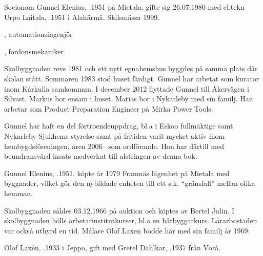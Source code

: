 Socionom Gunnel Elenius, .1951 på Mietala, gifte sig 26.07.1980 med el.tekn Urpo Laitala, .1951 i Alahärmä. Skilsmässa 1999.
\begin{jhchildren}
  \item {}, automationsingenjör
  \item {}, fordonsmekaniker
\end{jhchildren}

Skolbyggnaden revs 1981 och ett nytt egnahemshus byggdes på samma plats där skolan stått. Sommaren 1983 stod huset färdigt. Gunnel har arbetat som kurator inom Kårkulla samkommun. I december 2012 flyttade Gunnel till Åkervägen i Silvast. Markus bor ensam i huset. Matias bor i Nykarleby med sin familj. Han arbetar som Product Preparation Engineer på Mirka Power Tools.

Gunnel har haft en del förtroendeuppdrag, bl.a i  Eskoo fullmäktige samt Nykarleby Sjukhems styrelse samt på fritiden varit mycket aktiv inom hembygdsföreningen, åren 2006-- som ordförande. Hon har därtill med beundransvärd insats medverkat till alstringen av denna bok.





Gunnel Elenius, .1951, köpte år 1979 Framnäs lägenhet på Mietala med byggnader, vilket gör den nybildade enheten till ett s.k. ``gränsfall'' mellan olika hemman.\jhvspace{}


Skolbyggnaden såldes 03.12.1966 på auktion och köptes av Bertel Julin. I skolbyggnaden hölls arbetarinstitutkurser, bl.a en båtbyggarkurs. Lärarbostaden var också uthyrd en tid. Målare Olof Laxen bodde här med sin familj år 1969:

Olof Laxén, .1933 i Jeppo, gift med Gretel Dahlkar, .1937 från Vörå.
\begin{jhchildren}
  \item {}
  \item {}
\end{jhchildren}

